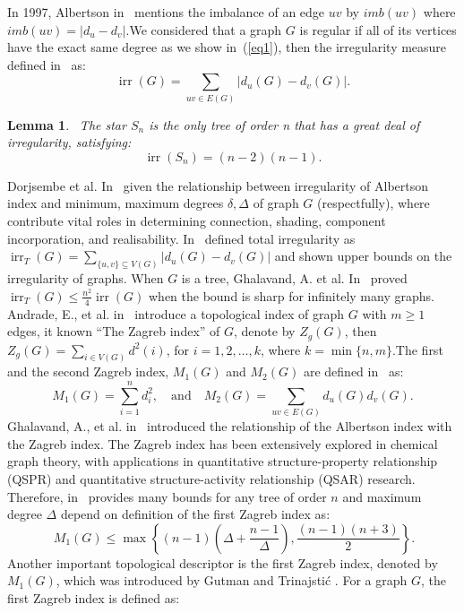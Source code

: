 \documentclass[12pt]{amsart}
\newtheorem{lemma}[theorem]{Lemma}
\begin{document}
 In 1997, Albertson in~\cite{ALBERTSON} mentions the imbalance of an edge $uv$ by $imb(uv)$ where $imb(uv)=\lvert d_u-d_v\rvert$.We considered that a graph $G$ is regular if all of its vertices have the exact same degree as we show in~(\ref{eq1}), then the irregularity measure defined in~\cite{ALBERTSON, GUTMAN2, Brandt} as:
\[
\operatorname{irr}(G)=\sum_{uv\in E(G)}\lvert d_u(G)-d_v(G) \rvert.
\]
\begin{lemma}\cite{Nasiri}~\label{lem1}
	The star $S_n$  is the only tree of order n that has a great deal of irregularity, satisfying:
	\[\operatorname{irr}\left( {{S_n}} \right) = \left( {n - 2} \right)\left( {n - 1} \right).\]
\end{lemma} 
 Dorjsembe et al. In~\cite{Dorjsembe} given the relationship between irregularity of Albertson index and minimum, maximum degrees $\delta,\Delta$ of graph $G$ (respectfully), where contribute vital roles in determining connection, shading, component incorporation, and realisability.  In~\cite{Hosam,Brandt} defined total irregularity as $\operatorname{irr}_T(G)=\sum_{\{u,v\} \subseteq V(G)}\lvert d_u(G)-d_v(G) \rvert$ and shown upper bounds on the irregularity of graphs. When $G$ is a tree, Ghalavand, A. et al. In~\cite{Ghalavand} proved  $\operatorname{irr}_T(G) \leq \frac{n^2}{4} \operatorname{irr}(G)$ when the bound is sharp for infinitely many graphs.  Andrade, E., et al. in~\cite{AndradeRobbianoLenes} introduce a topological index of graph $G$ with $m \geq 1$ edges, it known ``The Zagreb index'' of $G$, denote by $Z_{g}(G)$, then $Z_{g}(G)=\sum_{i \in V(G)} d^{2}(i)$, for $i=1,2, \ldots, k$, where $k=\min \{n, m\}$.The first and the second Zagreb index, $M_1(G)$ and $M_2(G)$ are defined in~\cite{GutmanTrinajstic, WILCOX,ALBERTSON,Liu} as: 
\[
M_1(G)=\sum_{i=1}^{n}d_i^2, \quad \text{and} \quad M_2(G)=\sum_{uv\in E(G)} d_u(G)d_v(G).
\] 
Ghalavand, A., et al. in~\cite{Ghalavand2023Tavakoli} introduced the relationship of the Albertson index with the Zagreb index. The Zagreb index has been extensively explored in chemical graph theory, with applications in quantitative structure-property relationship (QSPR) and quantitative structure-activity relationship (QSAR) research. Therefore, in~\cite{Kexiangsmallest, Dorjsembe,Sigarreta2021Rada,Gutman2024Gutman,Dimitrov2023Stevanovi, Furtula} provides many bounds for  any tree of order $n$ and maximum degree $\Delta$ depend on definition of the first Zagreb index as:
\begin{equation}~\label{eq2}
M_1(G)\leq \max \left\{(n-1)\left(\Delta+\frac{n-1}{\Delta}\right), \frac{(n-1)(n+3)}{2}\right\}.
\end{equation}
Another important topological descriptor is the first Zagreb index, denoted by $M_1(G)$, which was introduced by Gutman and Trinajstić \cite{GutmanTrinajstic}. For a graph $G$, the first Zagreb index is defined as:
\end{document}
